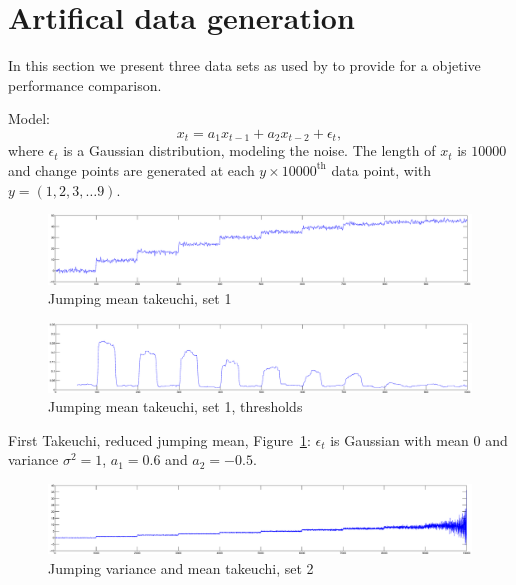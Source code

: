 \section{Artifical data generation}\label{sec:artificial_data_generation}
In this section we present three data sets as used by \cite{camci2010change,takeuchi2006unifying} to provide for a objetive performance comparison.

Model:
\begin{equation}
  x_t = a_1 x_{t-1} + a_2 x_{t-2} + \epsilon_t,
\end{equation}
where $\epsilon_t$ is a Gaussian distribution, modeling the noise.
The length of $x_t$ is $10000$ and change points are generated at each $y \times 10000^\text{th}$ data point, with $y = (1, 2, 3, \dots 9)$.

\begin{figure}
\centering
  \includegraphics[width=1\textwidth]{./Figures/notes/jumping_mean_takeuchi.eps}
  \caption[Jumping mean Takeuchi, set 1]{Jumping mean takeuchi, set 1}
  \label{fig:jumping_mean_takeuchi}
\end{figure}

\begin{figure}
\centering
  \includegraphics[width=1\textwidth]{./Figures/notes/jumping_mean_takeuchi_thresholds.eps}
  \caption[Jumping mean Takeuchi, set 1, thresholds]{Jumping mean takeuchi, set 1, thresholds}
\end{figure}


First Takeuchi, reduced jumping mean, Figure~\ref{fig:jumping_mean_takeuchi}:
$\epsilon_t$ is Gaussian with mean $0$ and variance $\sigma^2 = 1$, $a_1 = 0.6$ and $a_2 = -0.5$.

\begin{figure}
\centering
  \includegraphics[width=1\textwidth]{./Figures/notes/jumping_variance_mean_takeuchi.eps}
  \caption[Jumping variance and mean Takeuchi, set 2]{Jumping variance and mean takeuchi, set 2}
  \label{fig:jumping_variance_and_mean_takeuchi}
\end{figure}

